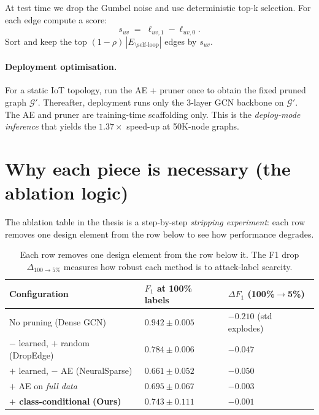 \documentclass[11pt,a4paper]{article}
\begin{document}
At test time we drop the Gumbel noise and use deterministic top-k
selection. For each edge compute a score:
\[
s_{uv} \;=\; \ell_{uv,1} - \ell_{uv,0}.
\]
Sort and keep the top $(1-\rho)\,|E_{\setminus\text{self-loop}}|$
edges by $s_{uv}$.

\paragraph{Deployment optimisation.}
For a static IoT topology, run the AE + pruner once to obtain the
fixed pruned graph $\mathcal{G}'$. Thereafter, deployment runs only
the 3-layer GCN backbone on $\mathcal{G}'$. The AE and pruner are
training-time scaffolding only. This is the
\emph{deploy-mode inference} that yields the $1.37\times$ speed-up at
50K-node graphs.

\section{Why each piece is necessary (the ablation logic)}

The ablation table in the thesis is a step-by-step \emph{stripping
experiment}: each row removes one design element from the row below
to see how performance degrades.

\begin{table}[h]
\centering
\caption{Each row removes one design element from the row below it.
The F1 drop $\Delta_{100\to 5\%}$ measures how robust each method is
to attack-label scarcity.}
\small
\begin{tabular}{p{4.5cm}p{3.5cm}p{4cm}}
\toprule
\textbf{Configuration} & $F_1$ at 100\% labels & $\Delta F_1$ (100\%$\to$5\%)\\
\midrule
No pruning (Dense GCN) & $0.942\pm 0.005$ & $-0.210$ (std explodes)\\
\hline
$-$ learned, $+$ random (DropEdge) & $0.784\pm 0.006$ & $-0.047$ \\
\hline
$+$ learned, $-$ AE (NeuralSparse) & $0.661\pm 0.052$ & $-0.050$ \\
\hline
$+$ AE on \emph{full data} & $0.695\pm 0.067$ & $-0.003$ \\
\hline
\textbf{$+$ class-conditional} \textbf{(Ours)} & $\bm{0.743\pm 0.111}$
& $\bm{-0.001}$ \\
\bottomrule
\end{tabular}
\end{table}
\end{document}
